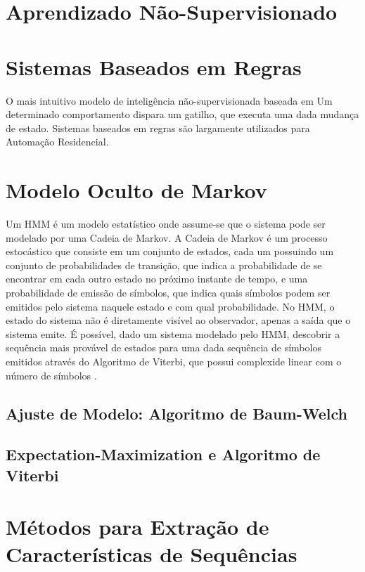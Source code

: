 \documentclass[
	12pt,				%
	openright,			%
	twoside,			%
	a4paper,			%
	english,			%
	spanish,			%
	brazil,				%
	]{abntex2}\usepackage[]{graphicx}\usepackage[]{color}
\begin{document}
\section{Aprendizado Não-Supervisionado}

\section{Sistemas Baseados em Regras}

O mais intuitivo modelo de inteligência não-supervisionada baseada em
Um determinado comportamento dispara um gatilho, que executa uma dada mudança de estado.
Sistemas baseados em regras são largamente utilizados para Automação Residencial.

\section{Modelo Oculto de Markov}

Um HMM é um modelo estatístico onde assume-se que o sistema pode ser modelado por uma Cadeia de Markov. A Cadeia de Markov é um processo estocástico que consiste em um conjunto de estados, cada um possuindo um conjunto de probabilidades de transição, que indica a probabilidade de se encontrar em cada outro estado no próximo instante de tempo, e uma probabilidade de emissão de símbolos, que indica quais símbolos podem ser emitidos pelo sistema naquele estado e com qual probabilidade. No HMM, o estado do sistema não é diretamente visível ao observador, apenas a saída que o sistema emite. É possível, dado um sistema modelado pelo HMM, descobrir a sequência mais provável de estados para uma dada sequência de símbolos emitidos através do Algoritmo de Viterbi, que possui complexide linear com o número de símbolos \cite{GHAHRAMANI2001}.

\subsection{Ajuste de Modelo: Algoritmo de Baum-Welch}


\subsection{Expectation-Maximization e Algoritmo de Viterbi}



\section{Métodos para Extração de Características de Sequências}
\end{document}
